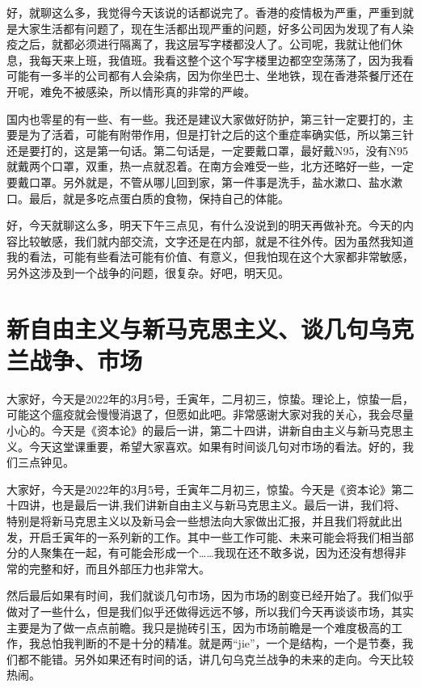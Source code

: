 \documentclass[UTF8, 12pt, a4paper]{ctexrep}
\begin{document}
好，就聊这么多，我觉得今天该说的话都说完了。香港的疫情极为严重，严重到就是大家生活都有问题了，现在生活都出现严重的问题，好多公司因为发现了有人染疫之后，就都必须进行隔离了，我这层写字楼都没人了。公司呢，我就让他们休息，我每天来上班，我值班。我看这整个这个写字楼里边都空空荡荡了，因为我看可能有一多半的公司都有人会染病，因为你坐巴士、坐地铁，现在香港茶餐厅还在开呢，难免不被感染，所以情形真的非常的严峻。

国内也零星的有一些、有一些。我还是建议大家做好防护，第三针一定要打的，主要是为了活着，可能有附带作用，但是打针之后的这个重症率确实低，所以第三针还是要打的，这是第一句话。第二句话是，一定要戴口罩，最好戴N95，没有N95就戴两个口罩，双重，热一点就忍着。在南方会难受一些，北方还略好一些，一定要戴口罩。另外就是，不管从哪儿回到家，第一件事是洗手，盐水漱口、盐水漱口。最后，就是多吃点蛋白质的食物，保持自己的体能。

好，今天就聊这么多，明天下午三点见，有什么没说到的明天再做补充。今天的内容比较敏感，我们就内部交流，文字还是在内部，就是不往外传。因为虽然我知道我的看法，可能有些看法可能有价值、有意义，但我怕现在这个大家都非常敏感，另外这涉及到一个战争的问题，很复杂。好吧，明天见。

\section{新自由主义与新马克思主义、谈几句乌克兰战争、市场}

大家好，今天是2022年的3月5号，壬寅年，二月初三，惊蛰。理论上，惊蛰一启，可能这个瘟疫就会慢慢消退了，但愿如此吧。非常感谢大家对我的关心，我会尽量小心的。今天是《资本论》的最后一讲，第二十四讲，讲新自由主义与新马克思主义。今天这堂课重要，希望大家喜欢。如果有时间谈几句对市场的看法。好的，我们三点钟见。

大家好，今天是2022年的3月5号，壬寅年二月初三，惊蛰。今天是《资本论》第二十四讲，也是最后一讲,我们讲新自由主义与新马克思主义。最后一讲，我们将、特别是将新马克思主义以及新马会一些想法向大家做出汇报，并且我们将就此出发，开启壬寅年的一系列新的工作。其中一些工作可能、未来可能会将我们相当部分的人聚集在一起，有可能会形成一个……我现在还不敢多说，因为还没有想得非常的完整和好，而且外部压力也非常大。

然后最后如果有时间，我们就谈几句市场，因为市场的剧变已经开始了。我们似乎做对了一些什么，但是我们似乎还做得远远不够，所以我们今天再谈谈市场，其实主要是为了做一点点前瞻。我只是抛砖引玉，因为市场前瞻是一个难度极高的工作，我总怕我判断的不是十分的精准。就是两“jie”，一个是结构，一个是节奏，我们都不能错。另外如果还有时间的话，讲几句乌克兰战争的未来的走向。今天比较热闹。
\end{document}
